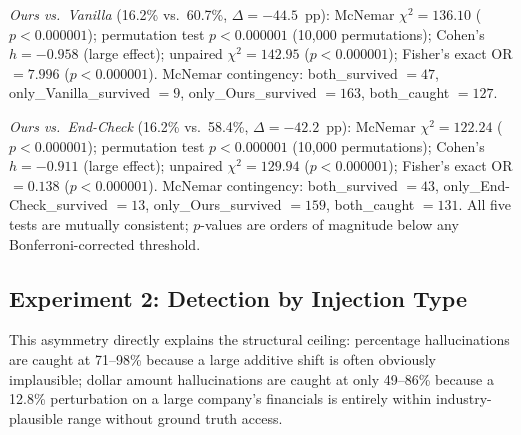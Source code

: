 \documentclass{article}
\theoremstyle{plain}
\theoremstyle{definition}
\theoremstyle{remark}
\begin{document}
\textit{Ours vs.\ Vanilla} (16.2\% vs.\ 60.7\%, $\Delta = -44.5$~pp): McNemar $\chi^2 = 136.10$ ($p < 0.000001$); permutation test $p < 0.000001$ (10,000 permutations); Cohen's $h = -0.958$ (large effect); unpaired $\chi^2 = 142.95$ ($p < 0.000001$); Fisher's exact OR $= 7.996$ ($p < 0.000001$). McNemar contingency: both\_survived $= 47$, only\_Vanilla\_survived $= 9$, only\_Ours\_survived $= 163$, both\_caught $= 127$.

\textit{Ours vs.\ End-Check} (16.2\% vs.\ 58.4\%, $\Delta = -42.2$~pp): McNemar $\chi^2 = 122.24$ ($p < 0.000001$); permutation test $p < 0.000001$ (10,000 permutations); Cohen's $h = -0.911$ (large effect); unpaired $\chi^2 = 129.94$ ($p < 0.000001$); Fisher's exact OR $= 0.138$ ($p < 0.000001$). McNemar contingency: both\_survived $= 43$, only\_End-Check\_survived $= 13$, only\_Ours\_survived $= 159$, both\_caught $= 131$. All five tests are mutually consistent; $p$-values are orders of magnitude below any Bonferroni-corrected threshold.

\subsection{Experiment 2: Detection by Injection Type}

\begin{table}[h]
\centering
\label{tab:injtype}
\vspace{5pt}
\caption{Detection rates by injection type at Stage~1, Experiment~2. Percentage hallucinations are easiest to catch; dollar amounts are hardest, explaining the structural ceiling.}
\end{table}

This asymmetry directly explains the structural ceiling: percentage hallucinations are caught at 71--98\% because a large additive shift is often obviously implausible; dollar amount hallucinations are caught at only 49--86\% because a 12.8\% perturbation on a large company's financials is entirely within industry-plausible range without ground truth access.
\end{document}
